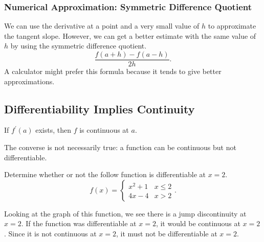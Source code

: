 \subsubsection{Numerical Approximation: Symmetric Difference Quotient}
We can use the derivative at a point and a very small value of $h$ to approximate the tangent slope.
However, we can get a better estimate with the same value of $h$ by using the symmetric difference quotient.
\begin{equation*}
	\frac{f(a+h)-f(a-h)}{2h}.
\end{equation*}
\noindent
A calculator might prefer this formula because it tends to give better approximations.

\subsection{Differentiability Implies Continuity}
\begin{theorem}
	If $f^\prime(a)$ exists, then $f$ is continuous at $a$.
\end{theorem}
\noindent
The converse is not necessarily true: a function can be continuous but not differentiable.

\begin{example}
	Determine whether or not the follow function is differentiable at $x=2$.
	\begin{equation*}
		f(x) = \begin{cases}
			x^2 + 1 & x \leq 2 \\
			4x-4 & x > 2
		\end{cases}.
	\end{equation*}
\end{example}
Looking at the graph of this function, we see there is a jump discontinuity at $x=2$.
If the function was differentiable at $x=2$, it would be continuous at $x=2$.
Since it is not continuous at $x=2$, it must not be differentiable at $x=2$.